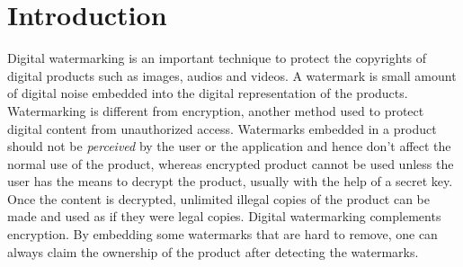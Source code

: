 \section{Introduction}
\label{sec:intro}

Digital watermarking is an important technique to 
protect the copyrights of digital products such as images, audios and
videos. A watermark is small amount of digital noise 
embedded into the digital representation of the products. 
%
%
Watermarking is different from encryption, another method used to 
protect digital content from unauthorized access. Watermarks embedded 
in a product should not be {\em perceived} by the user or the application and hence 
don't affect the normal use of the product, whereas encrypted product cannot
be used unless the user has the means to decrypt the product, usually
with the help of a secret key.
Once the content is decrypted, unlimited illegal copies of the 
product can be made and used as if they were legal copies. Digital 
watermarking complements encryption. By embedding 
some watermarks that are hard to remove, one can always claim the ownership 
of the product after detecting the watermarks. 
%


